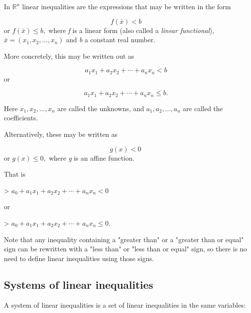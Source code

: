 In $\mathbb{R} ^n$ linear inequalities are the expressions that may be written in the form



$$f(\bar{x}) < b$$ or $f(\bar{x}) \leq b,$ where \textit{f} is a linear form (also called
a \textit{linear functional}), $\bar{x} = (x _1,x _2,\ldots,x _n)$ and \textit{b} a
constant real number.



More concretely, this may be written out as



$$a _1 x _1 + a _2 x _2 + \cdots + a _n x _n < b$$ or



$$a _1 x _1 + a _2 x _2 + \cdots + a _n x _n \leq b.$$



Here $x _1, x _2,...,x _n$ are called the unknowns, and $a _{1}, a _{2},..., a _{n}$ are
called the coefficients.



Alternatively, these may be written as



$$g(x) < 0 \,$$ or $g(x) \leq 0,$ where \textit{g} is an affine function.



That is



> $a _0 + a _1 x _1 + a _2 x _2 + \cdots + a _n x _n < 0$



or



> $a _0 + a _1 x _1 + a _2 x _2 + \cdots + a _n x _n \leq 0.$



Note that any inequality containing a "greater than" or a "greater than or equal" sign can
be rewritten with a "less than" or "less than or equal" sign, so there is no need to
define linear inequalities using those signs.




\subsection{Systems of linear inequalities}
\label{sss:syst-799f}




A system of linear inequalities is a set of linear inequalities in the same variables:




